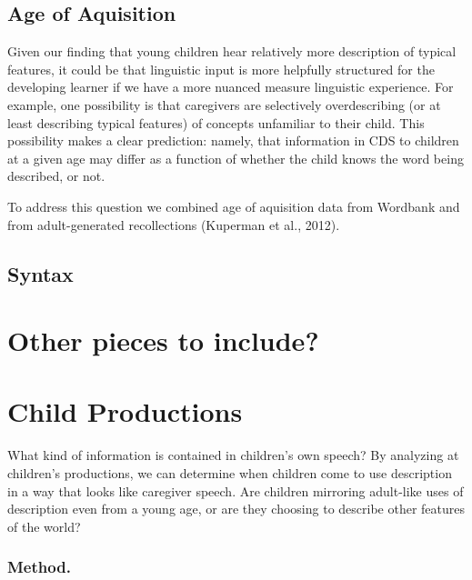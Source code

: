 \documentclass[10pt, letterpaper]{article}
\begin{document}
\hypertarget{age-of-aquisition}{%
\subsection{Age of Aquisition}\label{age-of-aquisition}}

Given our finding that young children hear relatively more description
of typical features, it could be that linguistic input is more helpfully
structured for the developing learner if we have a more nuanced measure
linguistic experience. For example, one possibility is that caregivers
are selectively overdescribing (or at least describing typical features)
of concepts unfamiliar to their child. This possibility makes a clear
prediction: namely, that information in CDS to children at a given age
may differ as a function of whether the child knows the word being
described, or not.

To address this question we combined age of aquisition data from
Wordbank and from adult-generated recollections (Kuperman et al., 2012).

\hypertarget{syntax}{%
\subsection{Syntax}\label{syntax}}

\hypertarget{other-pieces-to-include}{%
\section{Other pieces to include?}\label{other-pieces-to-include}}

\hypertarget{child-productions}{%
\section{Child Productions}\label{child-productions}}

What kind of information is contained in children's own speech? By
analyzing at children's productions, we can determine when children come
to use description in a way that looks like caregiver speech. Are
children mirroring adult-like uses of description even from a young age,
or are they choosing to describe other features of the world?

\hypertarget{method.}{%
\subsubsection{Method.}\label{method.}}
\end{document}
